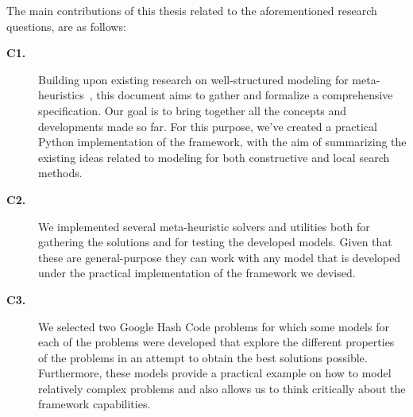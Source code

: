 The main contributions of this thesis related to the aforementioned research
questions, are as follows:

\begin{description}

  \item[\textbf{C1.}] Building upon existing research on well-structured
    modeling for meta-heuristics~\cite{vieira2009uma,fonseca2021nasf4nio,outeiro2021application},
    this document aims to gather and formalize a comprehensive specification. Our
    goal is to bring together all the concepts and developments made so far. For
    this purpose, we've created a practical Python implementation of the
    framework, with the aim of summarizing the existing ideas related to modeling
    for both constructive and local search methods.

  \item[\textbf{C2.}] We implemented several meta-heuristic solvers and utilities
    both for gathering the solutions and for testing the developed models. Given
    that these are general-purpose they can work with any model that is developed
    under the practical implementation of the framework we devised.

  \item[\textbf{C3.}] We selected two Google Hash Code problems for which some
    models for each of the problems were developed that explore the different
    properties of the problems in an attempt to obtain the best solutions
    possible. Furthermore, these models provide a practical example on how to
    model relatively complex problems and also allows us to think critically
    about the framework capabilities.
\end{description}
